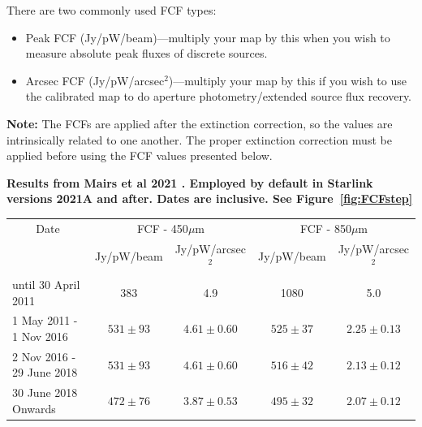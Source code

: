 \vspace{5mm}

There are two commonly used FCF types:
\begin{itemize}
\item Peak FCF (Jy/pW/beam)---multiply your map by this when you wish
to measure absolute peak fluxes of discrete sources.
\item Arcsec FCF (Jy/pW/arcsec$^2$)---multiply your map by this if
you wish to use the calibrated map to do aperture photometry/extended source flux recovery.
\end{itemize}

\textbf{Note:} The FCFs are applied after the extinction correction, so the values are intrinsically
related to one another. The proper extinction correction must be applied before using the FCF
values presented below.

\newpage

\textbf{Results from Mairs et al 2021 \cite{mairs21}. Employed by default in Starlink versions 2021A and after. Dates are inclusive. See Figure~\ref{fig:FCFstep}}\\
\begin{table}[h!]
\begin{center}
\begin{tabular}{|l|c|c|c|c|}
 \hline
 \multicolumn{1}{|c|}{Date} &
 \multicolumn{2}{c|}{FCF - 450$\mu$m} &
 \multicolumn{2}{c|}{FCF - 850$\mu$m} \\
\cline{2-5}
& Jy/pW/beam &Jy/pW/arcsec$^2$ & Jy/pW/beam &Jy/pW/arcsec$^2$ \\
 \hline
until 30 April 2011 &383  & 4.9 &1080 &5.0 \\
1 May 2011 - 1 Nov 2016 & $531\pm93$ & $4.61\pm0.60$ & $525\pm37$ & $2.25\pm0.13$ \\
2 Nov 2016 - 29 June 2018 & $531\pm93$ & $4.61\pm0.60$ & $516\pm42$ & $2.13\pm0.12$ \\
30 June 2018 Onwards & $472\pm76$ & $3.87\pm0.53$ & $495\pm32$ & $2.07\pm0.12$ 
 \\
\hline
\end{tabular}
\end{center}
\end{table}

